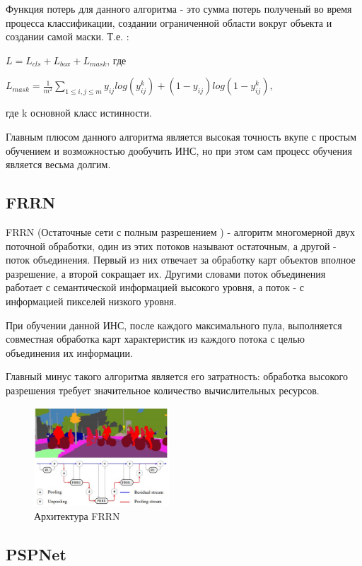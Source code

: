 \documentclass[bachelor, och, coursework]{shiza}
\begin{document}
Функция потерь для данного алгоритма - это сумма потерь полученый во время процесса классификации, создании ограниченной области вокруг объекта и создании самой маски. Т.е. :

\begin{center}
    $L = L_{cls} + L_{box} + L_{mask}$, где
    
    $L_{mask} = \frac{1}{m^2}\sum\limits_{1 \leq i, j \leq m}y_{ij}log(y_{ij}^k) + (1 - y_{ij})log(1 - y_{ij}^k),$
\end{center}
где k основной класс истинности.

Главным плюсом данного алгоритма является высокая точность вкупе с простым обучением и возможностью дообучить ИНС, но при этом сам процесс обучения
является весьма долгим.

\subsection{FRRN}

FRRN (Остаточные сети с полным разрешением ) - алгоритм многомерной двух поточной обработки, один из этих потоков называют остаточным, а другой - поток 
объединения. Первый из них отвечает за обработку карт объектов вполное разрешение, а второй сокращает их. Другими словами поток объединения работает с 
семантической информацией высокого уровня, а поток - с информацией пикселей низкого уровня.

При обучении данной ИНС, после каждого максимального пула, выполняется совместная обработка карт характеристик из каждого потока с целью объединения их информации.

Главный минус такого алгоритма является его затратность: обработка высокого разрешения требует значительное количество вычислительных ресурсов.

\begin{figure}[H]
    \centering
    \includegraphics[width=0.45\textwidth]{11}
    \caption{Архитектура FRRN}
    \label{fig:img1}
\end{figure}

\subsection{PSPNet}
\end{document}
